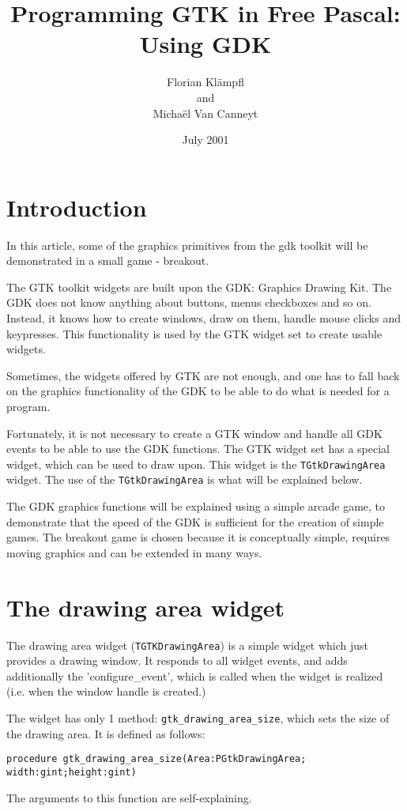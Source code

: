 \documentclass[10pt]{article}
\newcommand{\var}[1]{\texttt{#1}}
\begin{document}
\title{Programming GTK in Free Pascal: Using GDK}
\author{Florian Kl\"ampfl\\and\\Micha\"el Van Canneyt}
\date{July 2001}
\maketitle
\section{Introduction}
In this article, some of the graphics primitives from the gdk toolkit will
be demonstrated in a small game - breakout.

The GTK toolkit widgets are built upon the GDK: Graphics Drawing Kit. 
The GDK does not know anything about buttons, menus checkboxes and so on.
Instead, it knows how to create windows, draw on them, handle mouse clicks
and keypresses. This functionality is used by the GTK widget set to create
usable widgets.

Sometimes, the widgets offered by GTK are not enough, and one has to fall
back on the graphics functionality of the GDK to be able to do what is 
needed for a program.

Fortunately, it is not necessary to create a GTK window and handle all
GDK events to be able to use the GDK functions. The GTK widget set has a
special widget, which can be used to draw upon. This widget is the 
\var{TGtkDrawingArea} widget. The use of the \var{TGtkDrawingArea} is what
will be explained below.

The GDK graphics functions will be explained using a simple arcade game,
to demonstrate that the speed of the GDK is sufficient for the creation of
simple games. The breakout game is chosen because it is conceptually simple, 
requires moving graphics and can be extended in many ways.

\section{The drawing area widget}
The drawing area widget (\var{TGTKDrawingArea}) is a simple widget which
just provides a drawing window. It responds to all widget events, and adds
additionally the 'configure\_event', which is called when the widget is
realized (i.e. when the window handle is created.)

The widget has only 1 method: \var{gtk\_drawing\_area\_size}, which sets
the size of the drawing area. It is defined as follows:
\begin{verbatim}
procedure gtk_drawing_area_size(Area:PGtkDrawingArea; width:gint;height:gint) 
\end{verbatim}
The arguments to this function are self-explaining.
\end{document}
